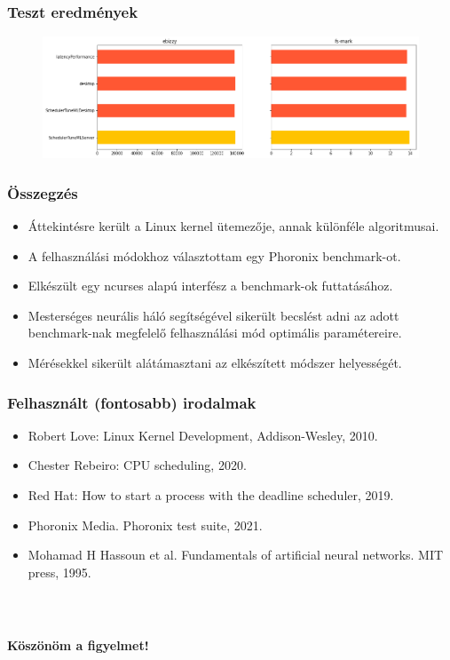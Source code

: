\documentclass{beamer}
\begin{document}
\begin{frame}
\frametitle{Teszt eredmények}
\begin{figure}
	\begin{center}
		\includegraphics[height=0.4\textheight]{images/tunedAndSchedulerTuneMLCompareEbizzyAndFsMark.png}
	\end{center}	
\end{figure} 
\end{frame}

\begin{frame}
	\frametitle{Összegzés}
	
\begin{itemize}
	\item Áttekintésre került a Linux kernel ütemezője, annak különféle algoritmusai.
	\item A felhasználási módokhoz választottam egy Phoronix benchmark-ot.
	\item Elkészült egy ncurses alapú interfész a benchmark-ok futtatásához.
	\item Mesterséges neurális háló segítségével sikerült becslést adni az adott benchmark-nak megfelelő felhasználási mód optimális paramétereire.
	\item Mérésekkel sikerült alátámasztani az elkészített módszer helyességét.
\end{itemize}
	
\end{frame}

\begin{frame}
	\frametitle{Felhasznált (fontosabb) irodalmak}
	
	\begin{itemize}
		\item Robert Love: Linux Kernel Development, Addison-Wesley, 2010.
		\item Chester Rebeiro: CPU scheduling, 2020.
		\item Red Hat: How to start a process with the deadline scheduler, 2019.
\item Phoronix Media. Phoronix test suite, 2021.
		\item Mohamad H Hassoun et al. Fundamentals of artificial neural networks. MIT press, 1995.
	\end{itemize}
	
\end{frame}

\begin{frame}
\frametitle{\ }
\begin{center}
\Huge \textbf{Köszönöm a figyelmet!}
\end{center}
\end{frame}
\end{document}
